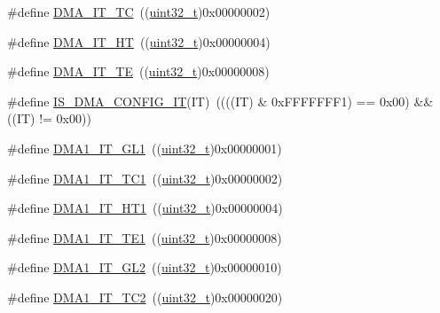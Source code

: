 \begin{DoxyCompactItemize}
\item 
\#define \hyperlink{group___d_m_a__interrupts__definition_ga06e83dd277e0d3e5635cf8ce8dfd6e16}{D\+M\+A\+\_\+\+I\+T\+\_\+\+TC}~((\hyperlink{_p_e___types_8h_a33594304e786b158f3fb30289278f5af}{uint32\+\_\+t})0x00000002)
\item 
\#define \hyperlink{group___d_m_a__interrupts__definition_gadf11c572b9797e04a14b105fdc2e5f66}{D\+M\+A\+\_\+\+I\+T\+\_\+\+HT}~((\hyperlink{_p_e___types_8h_a33594304e786b158f3fb30289278f5af}{uint32\+\_\+t})0x00000004)
\item 
\#define \hyperlink{group___d_m_a__interrupts__definition_gaf9d92649d2a0146f663ff253d8f3b59e}{D\+M\+A\+\_\+\+I\+T\+\_\+\+TE}~((\hyperlink{_p_e___types_8h_a33594304e786b158f3fb30289278f5af}{uint32\+\_\+t})0x00000008)
\item 
\#define \hyperlink{group___d_m_a__interrupts__definition_ga47f6af7da302c19aba24516037d305e7}{I\+S\+\_\+\+D\+M\+A\+\_\+\+C\+O\+N\+F\+I\+G\+\_\+\+IT}(IT)~((((IT) \& 0x\+F\+F\+F\+F\+F\+F\+F1) == 0x00) \&\& ((\+I\+T) != 0x00))
\item 
\#define \hyperlink{group___d_m_a__interrupts__definition_ga017d35f4f6fbf5689ef39af7227bc5b0}{D\+M\+A1\+\_\+\+I\+T\+\_\+\+G\+L1}~((\hyperlink{_p_e___types_8h_a33594304e786b158f3fb30289278f5af}{uint32\+\_\+t})0x00000001)
\item 
\#define \hyperlink{group___d_m_a__interrupts__definition_ga783532083dcc6e9752feb2e982ce7426}{D\+M\+A1\+\_\+\+I\+T\+\_\+\+T\+C1}~((\hyperlink{_p_e___types_8h_a33594304e786b158f3fb30289278f5af}{uint32\+\_\+t})0x00000002)
\item 
\#define \hyperlink{group___d_m_a__interrupts__definition_gaea8c98e79c8cb420c81f7380a4c8e1da}{D\+M\+A1\+\_\+\+I\+T\+\_\+\+H\+T1}~((\hyperlink{_p_e___types_8h_a33594304e786b158f3fb30289278f5af}{uint32\+\_\+t})0x00000004)
\item 
\#define \hyperlink{group___d_m_a__interrupts__definition_ga0121b479efafe485719d14634a02d542}{D\+M\+A1\+\_\+\+I\+T\+\_\+\+T\+E1}~((\hyperlink{_p_e___types_8h_a33594304e786b158f3fb30289278f5af}{uint32\+\_\+t})0x00000008)
\item 
\#define \hyperlink{group___d_m_a__interrupts__definition_ga183f3044b39da5e3b3c688239086f836}{D\+M\+A1\+\_\+\+I\+T\+\_\+\+G\+L2}~((\hyperlink{_p_e___types_8h_a33594304e786b158f3fb30289278f5af}{uint32\+\_\+t})0x00000010)
\item 
\#define \hyperlink{group___d_m_a__interrupts__definition_ga14171253268d69143102594cde56b0e1}{D\+M\+A1\+\_\+\+I\+T\+\_\+\+T\+C2}~((\hyperlink{_p_e___types_8h_a33594304e786b158f3fb30289278f5af}{uint32\+\_\+t})0x00000020)

\end{DoxyCompactItemize}
